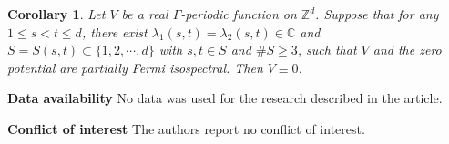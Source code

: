 \documentclass[12pt,letterpaper]{amsart}
\newtheorem{corollary}{Corollary}[section]
\def\C{{\mathbb C}}
\def\Z{{\mathbb Z}}
\begin{document}
\begin{corollary}
	Let $V$ be a real $\Gamma$-periodic function on $\Z^d$. Suppose that for any $1\leq s<t\leq d$, there exist $\lambda_1(s,t)=\lambda_2(s,t)\in\C$ and $S=S(s,t)\subset \{1,2,\cdots,d\}$ with $s,t\in S$ and $\# S\geq 3$, such that $V$ and the zero potential are partially Fermi isospectral. Then $V\equiv0$.
\end{corollary}



\vspace{2mm}\noindent \textbf{Data availability}
No data was used for the research described in the article.

\vspace{2mm}\noindent \textbf{Conflict of interest} The authors report no conflict of interest.
\end{document}
